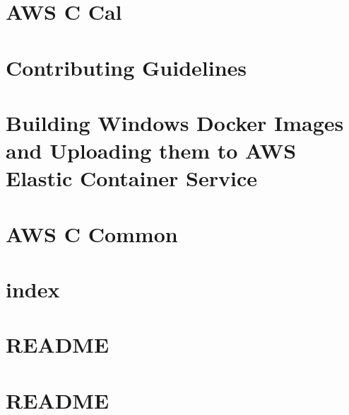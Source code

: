 \documentclass[twoside]{book}
\newcommand{\+}{\discretionary{\mbox{\scriptsize$\hookleftarrow$}}{}{}}
\begin{document}
\chapter{AWS C Cal}
\label{md_crt_aws_crt_cpp_crt_aws_c_cal__r_e_a_d_m_e}

\chapter{Contributing Guidelines}
\label{md_crt_aws_crt_cpp_crt_aws_c_common__c_o_n_t_r_i_b_u_t_i_n_g}

\chapter{Building Windows Docker Images and Uploading them to AWS Elastic Container Service}
\label{md_crt_aws_crt_cpp_crt_aws_c_common_docker_images__r_e_a_d_m_e}

\chapter{AWS C Common}
\label{md_crt_aws_crt_cpp_crt_aws_c_common__r_e_a_d_m_e}

\chapter{index}
\label{md_crt_aws_crt_cpp_crt_aws_c_common_verification_cbmc_litani_doc_index}

\chapter{README}
\label{md_crt_aws_crt_cpp_crt_aws_c_common_verification_cbmc_litani__r_e_a_d_m_e}

\chapter{README}
\label{md_crt_aws_crt_cpp_crt_aws_c_common_verification_cbmc_litani_test__r_e_a_d_m_e}

\end{document}
